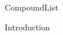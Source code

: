\documentclass[10pt,a4paper]{article}
\begin{document}

{CompoundList}

\tableofcontents



\newpage
{Introduction}

\newpage
{}


\listoftodos
\end{document}

